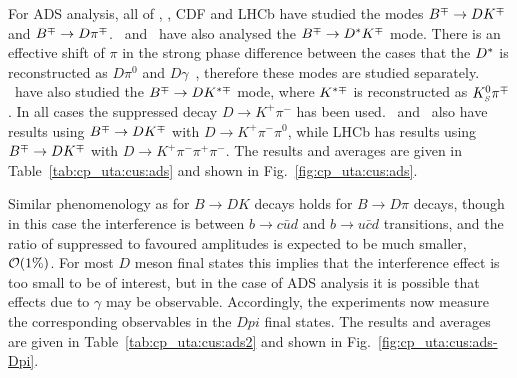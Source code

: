 For ADS analysis, all of \babar, \belle, CDF and LHCb have studied the modes 
$B^\mp \to DK^\mp$ and $B^\mp \to D\pi^\mp$. 
\babar\ and \belle\ have also analysed the $B^\mp \to D^*K^\mp$ mode.
There is an effective shift of $\pi$ in the strong phase difference between
the cases that the $D^*$ is reconstructed as $D\pi^0$ and
$D\gamma$~\cite{Bondar:2004bi}, therefore these modes are studied separately.
\babar\ have also studied the $B^\mp \to DK^{*\mp}$ mode, 
where $K^{*\mp}$ is reconstructed as $K^0_{\scriptscriptstyle S}\pi^\mp$.
In all cases the suppressed decay $D \to K^+\pi^-$ has been used.
\babar\ and \belle\ also have results using $B^\mp \to DK^\mp$ with $D \to K^+\pi^-\pi^0$,
while LHCb has results using $B^\mp \to DK^\mp$ with $D \to K^+\pi^-\pi^+\pi^-$.
The results and averages are given in Table~\ref{tab:cp_uta:cus:ads}
and shown in Fig.~\ref{fig:cp_uta:cus:ads}.

Similar phenomenology as for $B \to DK$ decays holds for $B \to D\pi$ decays, though in this case the interference is between $b \to c\bar{u}d$ and $b \to u\bar{c}d$ transitions, and the ratio of suppressed to favoured amplitudes is expected to be much smaller, ${\cal O}(1\%)$.
For most $D$ meson final states this implies that the interference effect is too small to be of interest, but in the case of ADS analysis it is possible that effects due to $\gamma$ may be observable.
Accordingly, the experiments now measure the corresponding observables in the $Dpi$ final states.
The results and averages are given in Table~\ref{tab:cp_uta:cus:ads2}
and shown in Fig.~\ref{fig:cp_uta:cus:ads-Dpi}.



